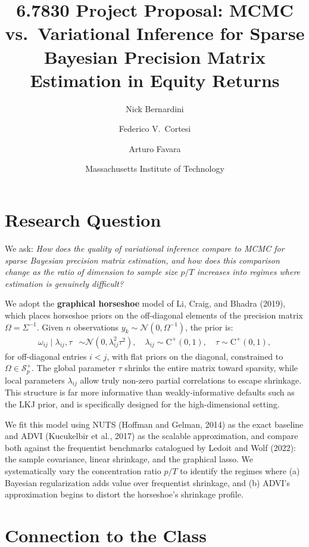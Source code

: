 \documentclass[11pt]{article}
\title{\vspace{-1.5em}\textbf{6.7830 Project Proposal: MCMC vs.\ Variational Inference for Sparse Bayesian Precision Matrix Estimation in Equity Returns}\vspace{-0.5em}}
\author{Nick Bernardini \and Federico V.\ Cortesi \and Arturo Favara}
\date{\vspace{-1.5em}Massachusetts Institute of Technology}
\begin{document}
\maketitle
\vspace{-1em}

\section{Research Question}

We ask: \emph{How does the quality of variational inference compare to MCMC for sparse Bayesian precision matrix estimation, and how does this comparison change as the ratio of dimension to sample size $p/T$ increases into regimes where estimation is genuinely difficult?}

We adopt the \textbf{graphical horseshoe} model of Li, Craig, and Bhadra (2019), which places horseshoe priors on the off-diagonal elements of the precision matrix $\Omega = \Sigma^{-1}$. Given $n$ observations $y_k \sim \mathcal{N}(0, \Omega^{-1})$, the prior is:
\begin{align*}
\omega_{ij} \mid \lambda_{ij}, \tau &\sim \mathcal{N}(0, \lambda_{ij}^2 \tau^2), \quad
\lambda_{ij} \sim \mathrm{C}^+(0,1), \quad
\tau \sim \mathrm{C}^+(0,1),
\end{align*}
for off-diagonal entries $i < j$, with flat priors on the diagonal, constrained to $\Omega \in \mathcal{S}_p^+$. The global parameter $\tau$ shrinks the entire matrix toward sparsity, while local parameters $\lambda_{ij}$ allow truly non-zero partial correlations to escape shrinkage. This structure is far more informative than weakly-informative defaults such as the LKJ prior, and is specifically designed for the high-dimensional setting.

We fit this model using NUTS (Hoffman and Gelman, 2014) as the exact baseline and ADVI (Kucukelbir et al., 2017) as the scalable approximation, and compare both against the frequentist benchmarks catalogued by Ledoit and Wolf (2022): the sample covariance, linear shrinkage, and the graphical lasso. We systematically vary the concentration ratio $p/T$ to identify the regimes where (a) Bayesian regularization adds value over frequentist shrinkage, and (b) ADVI's approximation begins to distort the horseshoe's shrinkage profile.

\section{Connection to the Class}
\end{document}
